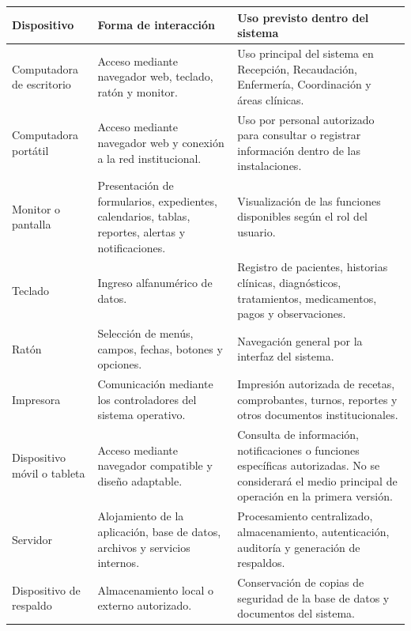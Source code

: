 \documentclass[11pt,a4paper]{article}
\begin{document}
	\begin{longtable}{p{} p{} p{}}
		
		
		
		\toprule
		\textbf{Dispositivo} &
		\textbf{Forma de interacción} &
		\textbf{Uso previsto dentro del sistema} \\
		\midrule
		\endhead
		
		\bottomrule
		\endlastfoot
		
		Computadora de escritorio &
		Acceso mediante navegador web, teclado, ratón y monitor. &
		Uso principal del sistema en Recepción, Recaudación, Enfermería,
		Coordinación y áreas clínicas. \\
		
		Computadora portátil &
		Acceso mediante navegador web y conexión a la red institucional. &
		Uso por personal autorizado para consultar o registrar información dentro de
		las instalaciones. \\
		
		Monitor o pantalla &
		Presentación de formularios, expedientes, calendarios, tablas, reportes,
		alertas y notificaciones. &
		Visualización de las funciones disponibles según el rol del usuario. \\
		
		Teclado &
		Ingreso alfanumérico de datos. &
		Registro de pacientes, historias clínicas, diagnósticos, tratamientos,
		medicamentos, pagos y observaciones. \\
		
		Ratón  &
		Selección de menús, campos, fechas, botones y opciones. &
		Navegación general por la interfaz del sistema. \\
		
		Impresora &
		Comunicación mediante los controladores del sistema operativo. &
		Impresión autorizada de recetas, comprobantes, turnos, reportes y otros
		documentos institucionales. \\
		
		
		Dispositivo móvil o tableta &
		Acceso mediante navegador compatible y diseño adaptable. &
		Consulta de información, notificaciones o funciones específicas autorizadas.
		No se considerará el medio principal de operación en la primera versión. \\
		
		Servidor &
		Alojamiento de la aplicación, base de datos, archivos y servicios internos. &
		Procesamiento centralizado, almacenamiento, autenticación, auditoría y
		generación de respaldos. \\
		
		Dispositivo de respaldo &
		Almacenamiento local o externo autorizado. &
		Conservación de copias de seguridad de la base de datos y documentos del
		sistema. \\
		
	\end{longtable}
	
\end{document}

